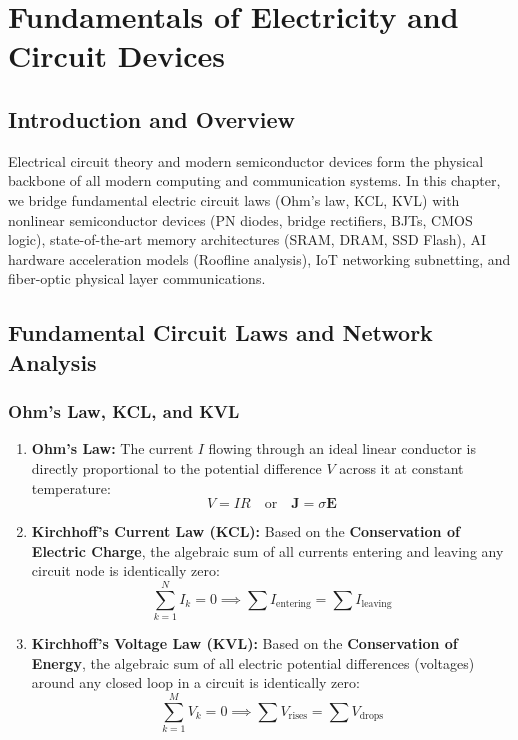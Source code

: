 \chapter{Fundamentals of Electricity and Circuit Devices}
\label{chap:electricity_devices}

\section{Introduction and Overview}
Electrical circuit theory and modern semiconductor devices form the physical backbone of all modern computing and communication systems. In this chapter, we bridge fundamental electric circuit laws (Ohm's law, KCL, KVL) with nonlinear semiconductor devices (PN diodes, bridge rectifiers, BJTs, CMOS logic), state-of-the-art memory architectures (SRAM, DRAM, SSD Flash), AI hardware acceleration models (Roofline analysis), IoT networking subnetting, and fiber-optic physical layer communications.

\section{Fundamental Circuit Laws and Network Analysis}
\subsection{Ohm's Law, KCL, and KVL}
\begin{definitionbox}
\begin{enumerate}
    \item \textbf{Ohm's Law:} The current $I$ flowing through an ideal linear conductor is directly proportional to the potential difference $V$ across it at constant temperature:
    \begin{equation}
        V = I R \quad \text{or} \quad \mathbf{J} = \sigma \mathbf{E}
    \end{equation}
    \item \textbf{Kirchhoff's Current Law (KCL):} Based on the \textbf{Conservation of Electric Charge}, the algebraic sum of all currents entering and leaving any circuit node is identically zero:
    \begin{equation}
        \sum_{k=1}^N I_k = 0 \implies \sum I_{\text{entering}} = \sum I_{\text{leaving}}
    \end{equation}
    \item \textbf{Kirchhoff's Voltage Law (KVL):} Based on the \textbf{Conservation of Energy}, the algebraic sum of all electric potential differences (voltages) around any closed loop in a circuit is identically zero:
    \begin{equation}
        \sum_{k=1}^M V_k = 0 \implies \sum V_{\text{rises}} = \sum V_{\text{drops}}
    \end{equation}
\end{enumerate}
\end{definitionbox}

